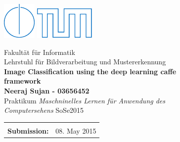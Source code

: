 \begin{figure}[!h]

  \includegraphics{pics/IN.pdf} \hfill \includegraphics{pics/tumlogo.pdf}
 
  \vspace*{1cm}
  {\large \textsf{Fakult{\"a}t f{\"u}r Informatik}}\\
  {\large \textsf{Lehrstuhl f{\"u}r Bildverarbeitung und Mustererkennung}}\\
 

  \vspace*{5cm}
%
%
%
%
  {\color{tumblue} \Huge \bf \textsf{Image Classification using the deep learning caffe framework}}\\  %

  \vspace*{1cm}
%
%
%
% 
  {\Large \bf \textsf{Neeraj Sujan - 03656452}}\\                  %
 
  \vspace*{8cm}
  {\Large \textsf{Praktikum \emph{Maschninelles Lernen f{\"u}r Anwendung des Computersehens} SoSe2015}}\\
 
  \vspace*{1cm} 
  \begin{tabular}{ll}
%
%
%
%
    \\

    \\

%
%
%
%
    {\Large \bf \textsf{Submission:}} &
    {\Large \textsf{08. May 2015}}

  \end{tabular}
  
\end{figure}
